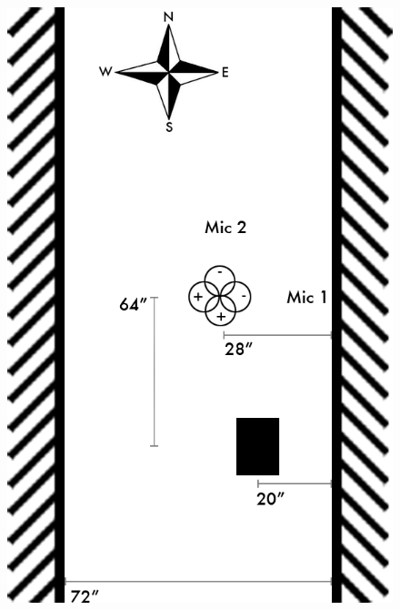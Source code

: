 \documentclass{aes137}
\begin{document}
\begin{figure}[h!]
\begin{minipage}[b]{0.46\linewidth} \centering
\includegraphics[width=\textwidth]{images/alleyway_birdseye.png}
\end{minipage}
\hspace{0.1\linewidth}
\begin{minipage}[b]{0.41\linewidth} \centering

\end{minipage}
\end{figure}
\end{document}
